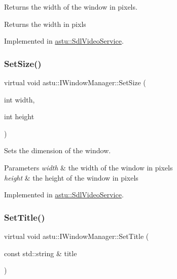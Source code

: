 Returns the width of the window in pixels.

\begin{DoxyReturn}{Returns}
the width in pixls 
\end{DoxyReturn}


Implemented in \hyperlink{classastu_1_1SdlVideoService_a45c3181611e718bcfe44862baed6d520}{astu\+::\+Sdl\+Video\+Service}.

\mbox{\label{classastu_1_1IWindowManager_aca77eeecb7c790fa3c1d58c20dd7294f}} 
\subsubsection{\texorpdfstring{Set\+Size()}{SetSize()}}
{\footnotesize\ttfamily virtual void astu\+::\+I\+Window\+Manager\+::\+Set\+Size (\begin{DoxyParamCaption}\item[{int}]{width,  }\item[{int}]{height }\end{DoxyParamCaption})\hspace{0.3cm}{\ttfamily [pure virtual]}}

Sets the dimension of the window.


\begin{DoxyParams}{Parameters}
{\em width} & the width of the window in pixels \\
\hline
{\em height} & the height of the window in pixels \\
\hline
\end{DoxyParams}


Implemented in \hyperlink{classastu_1_1SdlVideoService_a1c8d729ef42024bc0cc5065ecc6631c8}{astu\+::\+Sdl\+Video\+Service}.

\mbox{\label{classastu_1_1IWindowManager_ae75ef0ce5ff6943712b9aa55cbfaadf8}} 
\subsubsection{\texorpdfstring{Set\+Title()}{SetTitle()}}
{\footnotesize\ttfamily virtual void astu\+::\+I\+Window\+Manager\+::\+Set\+Title (\begin{DoxyParamCaption}\item[{const std\+::string \&}]{title }\end{DoxyParamCaption})\hspace{0.3cm}{\ttfamily [pure virtual]}}

